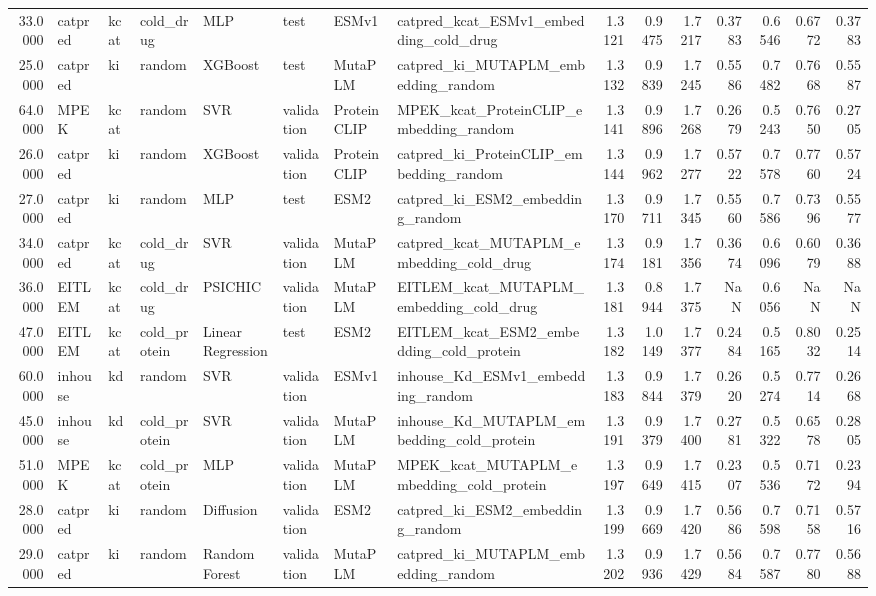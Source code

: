 \begin{tabular}{rlllllllrrrrrrr}
33.0000 & catpred & kcat & cold_drug & MLP & test & ESMv1 & catpred_kcat_ESMv1_embedding_cold_drug & 1.3121 & 0.9475 & 1.7217 & 0.3783 & 0.6546 & 0.6772 & 0.3783 \\
25.0000 & catpred & ki & random & XGBoost & test & MutaPLM & catpred_ki_MUTAPLM_embedding_random & 1.3132 & 0.9839 & 1.7245 & 0.5586 & 0.7482 & 0.7668 & 0.5587 \\
64.0000 & MPEK & kcat & random & SVR & validation & ProteinCLIP & MPEK_kcat_ProteinCLIP_embedding_random & 1.3141 & 0.9896 & 1.7268 & 0.2679 & 0.5243 & 0.7650 & 0.2705 \\
26.0000 & catpred & ki & random & XGBoost & validation & ProteinCLIP & catpred_ki_ProteinCLIP_embedding_random & 1.3144 & 0.9962 & 1.7277 & 0.5722 & 0.7578 & 0.7760 & 0.5724 \\
27.0000 & catpred & ki & random & MLP & test & ESM2 & catpred_ki_ESM2_embedding_random & 1.3170 & 0.9711 & 1.7345 & 0.5560 & 0.7586 & 0.7396 & 0.5577 \\
34.0000 & catpred & kcat & cold_drug & SVR & validation & MutaPLM & catpred_kcat_MUTAPLM_embedding_cold_drug & 1.3174 & 0.9181 & 1.7356 & 0.3674 & 0.6096 & 0.6079 & 0.3688 \\
36.0000 & EITLEM & kcat & cold_drug & PSICHIC & validation & MutaPLM & EITLEM_kcat_MUTAPLM_embedding_cold_drug & 1.3181 & 0.8944 & 1.7375 & NaN & 0.6056 & NaN & NaN \\
47.0000 & EITLEM & kcat & cold_protein & Linear Regression & test & ESM2 & EITLEM_kcat_ESM2_embedding_cold_protein & 1.3182 & 1.0149 & 1.7377 & 0.2484 & 0.5165 & 0.8032 & 0.2514 \\
60.0000 & inhouse & kd & random & SVR & validation & ESMv1 & inhouse_Kd_ESMv1_embedding_random & 1.3183 & 0.9844 & 1.7379 & 0.2620 & 0.5274 & 0.7714 & 0.2668 \\
45.0000 & inhouse & kd & cold_protein & SVR & validation & MutaPLM & inhouse_Kd_MUTAPLM_embedding_cold_protein & 1.3191 & 0.9379 & 1.7400 & 0.2781 & 0.5322 & 0.6578 & 0.2805 \\
51.0000 & MPEK & kcat & cold_protein & MLP & validation & MutaPLM & MPEK_kcat_MUTAPLM_embedding_cold_protein & 1.3197 & 0.9649 & 1.7415 & 0.2307 & 0.5536 & 0.7172 & 0.2394 \\
28.0000 & catpred & ki & random & Diffusion & validation & ESM2 & catpred_ki_ESM2_embedding_random & 1.3199 & 0.9669 & 1.7420 & 0.5686 & 0.7598 & 0.7158 & 0.5716 \\
29.0000 & catpred & ki & random & Random Forest & validation & MutaPLM & catpred_ki_MUTAPLM_embedding_random & 1.3202 & 0.9936 & 1.7429 & 0.5684 & 0.7587 & 0.7780 & 0.5688 \\

\end{tabular}
